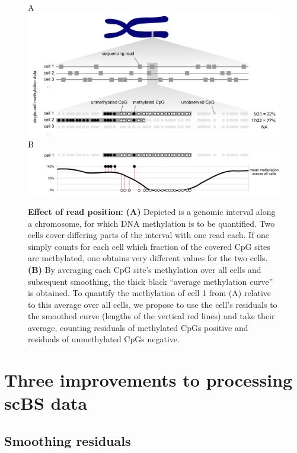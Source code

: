 \documentclass[twocolumn,10pt]{article}
\begin{document}
\begin{figure}
	A\\ 
	\includegraphics[width=\columnwidth]{figures/Fig_residuals_A.png}
	B\\
	\includegraphics[width=\columnwidth]{figures/Fig_residuals_B.png}
\caption{\small \textbf{Effect of read position:} \textbf{(A)} Depicted is a genomic interval along a chromosome, for which DNA methylation is to be quantified. Two cells cover differing parts of the interval with one read each. If one simply counts for each cell which fraction of the covered CpG sites are methylated, one obtains very different values for the two cells. \textbf{(B)} By averaging each CpG site's methylation over all cells and subsequent smoothing, the thick black ``average methylation curve'' is obtained. To quantify the methylation of cell 1 from (A) relative to this average over all cells, we propose to use the cell's residuals to the smoothed curve (lengths of the vertical red lines) and take their average, counting residuals of methylated CpGs positive and residuals of unmethylated CpGs negative.}
\label{smoothres}
\end{figure}

\section{Three improvements to processing scBS data}

\subsection{Smoothing residuals}
\end{document}

